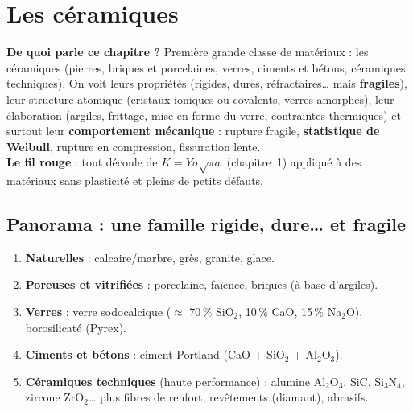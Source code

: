 \chapter{Les céramiques}

\begin{rembox}[title=En bref]
\textbf{De quoi parle ce chapitre ?} Première grande classe de matériaux : les céramiques
(pierres, briques et porcelaines, verres, ciments et bétons, céramiques techniques). On voit
leurs propriétés (rigides, dures, réfractaires\ldots{} mais \textbf{fragiles}), leur structure
atomique (cristaux ioniques ou covalents, verres amorphes), leur élaboration (argiles,
frittage, mise en forme du verre, contraintes thermiques) et surtout leur
\textbf{comportement mécanique} : rupture fragile, \textbf{statistique de Weibull}, rupture
en compression, fissuration lente. \\
\textbf{Le fil rouge} : tout découle de $K = Y\sigma\sqrt{\pi a}$ (chapitre~1) appliqué à des
matériaux sans plasticité et pleins de petits défauts.
\end{rembox}

\section{Panorama : une famille rigide, dure\ldots{} et fragile}

\begin{defnbox}[title=Les grandes familles de céramiques]
\begin{enumerate}
  \item \textbf{Naturelles} : calcaire/marbre, grès, granite, glace.
  \item \textbf{Poreuses et vitrifiées} : porcelaine, faïence, briques (à base d'argiles).
  \item \textbf{Verres} : verre sodocalcique ($\approx$ 70\,\% SiO$_2$, 10\,\% CaO, 15\,\%
        Na$_2$O), borosilicaté (Pyrex).
  \item \textbf{Ciments et bétons} : ciment Portland (CaO + SiO$_2$ + Al$_2$O$_3$).
  \item \textbf{Céramiques techniques} (haute performance) : alumine Al$_2$O$_3$, SiC,
        Si$_3$N$_4$, zircone ZrO$_2$\ldots{} plus fibres de renfort, revêtements (diamant),
        abrasifs.
\end{enumerate}
\end{defnbox}

